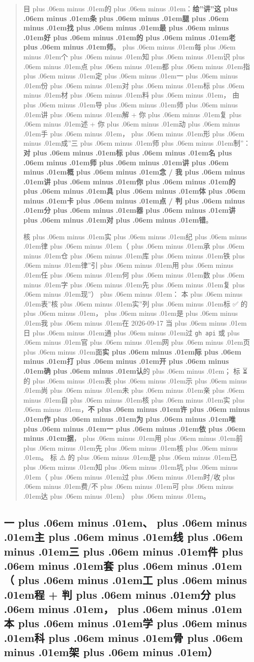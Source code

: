 \documentclass[
]{article}
\newcommand{\passthrough}[1]{#1}
\def\zh#1{{\zhfont #1}}
\def\sym#1{{\symfont #1}}
\def\emo#1{{\emofont #1}}
\def\zhglue{\hskip0pt plus .06em minus .01em}
\begin{document}
\begin{quote}
\zh{目\zhglue 的\zhglue ：}\textbf{\zh{给}''\zh{讲}''\zh{这\zhglue 条\zhglue 腿\zhglue 找\zhglue 最\zhglue 好\zhglue 的\zhglue 老\zhglue 师}}\zh{。\zhglue 每\zhglue 个\zhglue 知\zhglue 识\zhglue 点\zhglue 都\zhglue 指\zhglue 定\zhglue 一\zhglue 份\zhglue 对\zhglue 标\zhglue 材\zhglue 料\zhglue ，} \zh{由\zhglue 导\zhglue 师\zhglue 讲\zhglue 解} + \zh{你\zhglue 复\zhglue 述} + \zh{你\zhglue 动\zhglue 手\zhglue ，\zhglue 形\zhglue 成}''\zh{三\zhglue 师\zhglue 制}''\zh{：}\textbf{\zh{对\zhglue 标\zhglue 名\zhglue 师\zhglue 讲\zhglue 概\zhglue 念} / \zh{我\zhglue 讲\zhglue 你\zhglue 的\zhglue 具\zhglue 体\zhglue 卡\zhglue 点} / \zh{判\zhglue 分\zhglue 器\zhglue 讲\zhglue 对\zhglue 错}}\zh{。}

\zh{核\zhglue 实\zhglue 纪\zhglue 律\zhglue （\zhglue 承\zhglue 仓\zhglue 库\zhglue 铁\zhglue 律}''\zh{引\zhglue 用\zhglue 任\zhglue 何\zhglue 数\zhglue 字\zhglue 先\zhglue 复\zhglue 现}''\zh{）\zhglue ：} \zh{本\zhglue 表}''\zh{核\zhglue 实}''\zh{列\zhglue 标} \emo{✅} \zh{的\zhglue ，\zhglue 是\zhglue 我\zhglue 在} 2026-09-17 \zh{当\zhglue 日\zhglue 通\zhglue 过} \passthrough{\lstinline!gh api!} \zh{或\zhglue 官\zhglue 网\zhglue 页\zhglue 面}\textbf{\zh{实\zhglue 际\zhglue 打\zhglue 开\zhglue 确\zhglue 认}}\zh{的\zhglue ；} \zh{标} \emo{⏳} \zh{的\zhglue 表\zhglue 示\zhglue 尚\zhglue 未\zhglue 亲\zhglue 自\zhglue 核\zhglue 实\zhglue ，}\textbf{\zh{不\zhglue 许\zhglue 作\zhglue 为\zhglue 唯\zhglue 一\zhglue 依\zhglue 据}}\zh{，\zhglue 用\zhglue 前\zhglue 先\zhglue 核\zhglue 。} \zh{标} \sym{⚠️} \zh{的\zhglue 是\zhglue 已\zhglue 知\zhglue 坑\zhglue （\zhglue 过\zhglue 时}/\zh{收\zhglue 费}/\zh{不\zhglue 可\zhglue 达\zhglue ）\zhglue 。}
\end{quote}

\subsection{\zh{一\zhglue 、\zhglue 主\zhglue 线\zhglue 三\zhglue 件\zhglue 套\zhglue （\zhglue 工\zhglue 程} + \zh{判\zhglue 分\zhglue ，\zhglue 本\zhglue 学\zhglue 科\zhglue 骨\zhglue 架\zhglue ）}}\label{ux4e00ux4e3bux7ebfux4e09ux4ef6ux5957ux5de5ux7a0b-ux5224ux5206ux672cux5b66ux79d1ux9aa8ux67b6}
\end{document}
